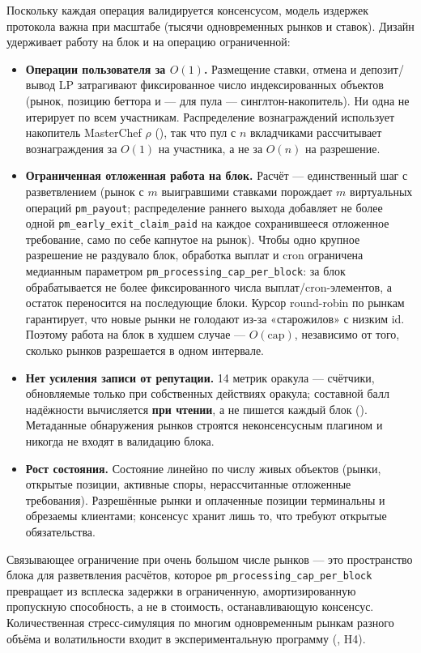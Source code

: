 \documentclass{ledger}
\theoremstyle{plain}
\theoremstyle{remark}
\begin{document}
Поскольку каждая операция валидируется консенсусом, модель издержек протокола важна
при масштабе (тысячи одновременных рынков и ставок). Дизайн удерживает работу на блок
и на операцию ограниченной:

\begin{itemize}
  \item \textbf{Операции пользователя за $O(1)$.} Размещение ставки, отмена и
  депозит/вывод LP затрагивают фиксированное число индексированных объектов (рынок,
  позицию беттора и --- для пула --- синглтон-накопитель). Ни одна не итерирует по
  всем участникам. Распределение вознаграждений использует накопитель MasterChef
  $\rho$ (), так что пул с $n$ вкладчиками рассчитывает
  вознаграждения за $O(1)$ на участника, а не за $O(n)$ на разрешение.
  \item \textbf{Ограниченная отложенная работа на блок.} Расчёт --- единственный шаг
  с разветвлением (рынок с $m$ выигравшими ставками порождает $m$ виртуальных
  операций \texttt{pm\_payout}; распределение раннего выхода добавляет не более одной
  \texttt{pm\_early\_exit\_claim\_paid} на каждое сохранившееся отложенное требование,
  само по себе капнутое на рынок). Чтобы одно крупное разрешение не раздувало блок,
  обработка выплат и cron ограничена медианным параметром
  \texttt{pm\_processing\_cap\_per\_block}: за блок обрабатывается не более
  фиксированного числа выплат/cron-элементов, а остаток переносится на последующие
  блоки. Курсор round-robin по рынкам гарантирует, что новые рынки не голодают из-за
  «старожилов» с низким id. Поэтому работа на блок в худшем случае --- $O(\text{cap})$,
  независимо от того, сколько рынков разрешается в одном интервале.
  \item \textbf{Нет усиления записи от репутации.} 14 метрик оракула --- счётчики,
  обновляемые только при собственных действиях оракула; составной балл надёжности
  вычисляется \textbf{при чтении}, а не пишется каждый блок ().
  Метаданные обнаружения рынков строятся неконсенсусным плагином и никогда не входят
  в валидацию блока.
  \item \textbf{Рост состояния.} Состояние линейно по числу живых объектов (рынки,
  открытые позиции, активные споры, нерассчитанные отложенные требования). Разрешённые
  рынки и оплаченные позиции терминальны и обрезаемы клиентами; консенсус хранит лишь
  то, что требуют открытые обязательства.
\end{itemize}

Связывающее ограничение при очень большом числе рынков --- это пространство блока для
разветвления расчётов, которое \texttt{pm\_processing\_cap\_per\_block} превращает из
всплеска задержки в ограниченную, амортизированную пропускную способность, а не в
стоимость, останавливающую консенсус. Количественная стресс-симуляция по многим
одновременным рынкам разного объёма и волатильности входит в экспериментальную
программу (, H4).
\end{document}
